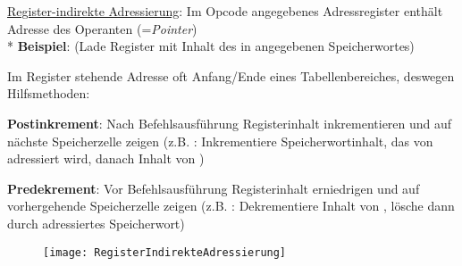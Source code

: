 \begin{items}
	\item \underline{Register-indirekte Adressierung}: Im Opcode angegebenes Adressregister enthält Adresse des Operanten (=\emph{Pointer}) \\* \textbf{Beispiel}:  (Lade Register  mit Inhalt des in  angegebenen Speicherwortes)
	\begin{items}
		\item Im Register stehende Adresse oft Anfang/Ende eines Tabellenbereiches, deswegen Hilfsmethoden:
		\item \textbf{Postinkrement}: Nach Befehlsausführung Registerinhalt inkrementieren und auf nächste Speicherzelle zeigen (z.B. : Inkrementiere Speicherwortinhalt, das von  adressiert wird, danach Inhalt von )
		\item \textbf{Predekrement}: Vor Befehlsausführung Registerinhalt erniedrigen und auf vorhergehende Speicherzelle zeigen (z.B. : Dekrementiere Inhalt von , lösche dann durch  adressiertes Speicherwort)
	\end{items}
		\begin{figure}[H]
		  \centering
		  \texttt{[image: RegisterIndirekteAdressierung]}
		  \label{RegisterIndirekteAdressierung}
		\end{figure}


\end{items}
